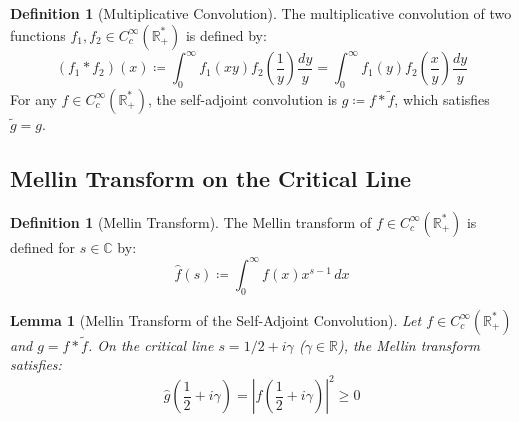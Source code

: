 \documentclass[11pt,a4paper]{article}
\newtheorem{lemma}[theorem]{Lemma}
\theoremstyle{definition}
\newtheorem{definition}[theorem]{Definition}
\begin{document}
\begin{definition}[Multiplicative Convolution]\label{def:weil_convolution}
The multiplicative convolution of two functions $f_1, f_2 \in C_c^\infty(\mathbb{R}_+^*)$ is defined by:
\begin{equation}\label{eq:convolution_exact}
(f_1 \ast f_2)(x) \coloneqq \int_0^\infty f_1(xy) f_2\left( \frac{1}{y} \right) \frac{dy}{y} = \int_0^\infty f_1(y) f_2\left( \frac{x}{y} \right) \frac{dy}{y}
\end{equation}
For any $f \in C_c^\infty(\mathbb{R}_+^*)$, the self-adjoint convolution is $g \coloneqq f \ast \tilde{f}$, which satisfies $\tilde{g} = g$.
\end{definition}

\subsection{Mellin Transform on the Critical Line}
\begin{definition}[Mellin Transform]\label{def:mellin_transform}
The Mellin transform of $f \in C_c^\infty(\mathbb{R}_+^*)$ is defined for $s \in \mathbb{C}$ by:
\begin{equation}\label{eq:mellin_def}
\hat{f}(s) \coloneqq \int_0^\infty f(x) x^{s - 1} \, dx
\end{equation}
\end{definition}

\begin{lemma}[Mellin Transform of the Self-Adjoint Convolution]\label{lem:mellin_involution}
Let $f \in C_c^\infty(\mathbb{R}_+^*)$ and $g = f \ast \tilde{f}$. On the critical line $s = 1/2 + i\gamma$ ($\gamma \in \mathbb{R}$), the Mellin transform satisfies:
\begin{equation}\label{eq:mellin_critical_sq}
\hat{g}\left( \frac{1}{2} + i\gamma \right) = \left| \hat{f}\left( \frac{1}{2} + i\gamma \right) \right|^2 \ge 0
\end{equation}
\end{lemma}
\end{document}
